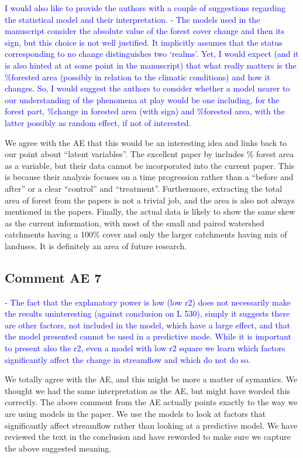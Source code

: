 \documentclass[]{elsarticle} %
\begin{document}
\textcolor{blue}{I would also like to provide the authors with a couple of suggestions regarding the statistical model and their interpretation. 
- The models used in the manuscript consider the absolute value of the forest cover change and then its sign, but this choice is not well justified. It implicitly assumes that the status corresponding to no change distinguishes two ‘realms’. Yet, I would expect (and it is also hinted at at some point in the manuscript) that what really matters is the \%forested area (possibly in relation to the climatic conditions) and how it changes. So, I would suggest the authors to consider whether a model nearer to our understanding of the phenomena at play would be one including, for the forest part, \%change in forested area (with sign) and \%forested area, with the latter possibly as random effect, if not of interested.}

We agree with the AE that this would be an interesting idea and links back to our point about ``latent variables''. The excellent paper by \citet{levy2018} includes \% forest area as a variable, but their data cannot be incorporated into the current paper. This is because their analysis focuses on a time progression rather than a ``before and after'' or a clear ``control'' and ``treatment''.
Furthermore, extracting the total area of forest from the papers is not a trivial job, and the area is also not always mentioned in the papers. Finally, the actual data is likely to show the same skew as the current information, with most of the small and paired watershed catchments having a 100\% cover and only the larger catchments having mix of landuses. It is definitely an area of future research.

\hypertarget{comment-ae-7}{%
\subsection{Comment AE 7}\label{comment-ae-7}}

\textcolor{blue}{- The fact that the explanatory power is low (low r2) does not necessarily make the results uninteresting (against conclusion on L 530), simply it suggests there are other factors, not included in the model, which have a large effect, and that the model presented cannot be used in a predictive mode. While it is important to present also the r2, even a model with low r2 square we learn which factors significantly affect the change in streamflow and which do not do so.}

We totally agree with the AE, and this might be more a matter of symantics. We thought we had the same interpretation as the AE, but might have worded this correctly. The above comment from the AE actually points exactly to the way we are using models in the paper. We use the models to look at factors that significantly affect streamflow rather than looking at a predictive model.
We have reviewed the text in the conclusion and have reworded to make sure we capture the above suggested meaning.


\end{document}

